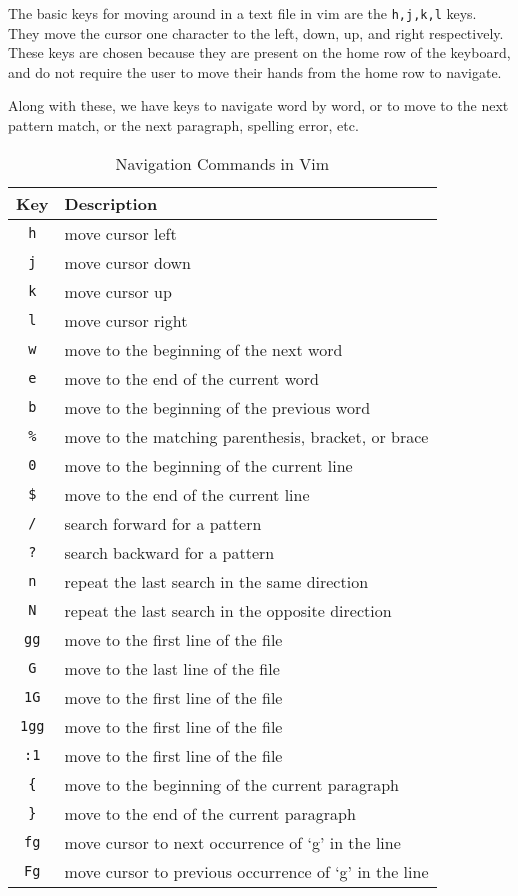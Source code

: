 The basic keys for moving around in a text file in vim
are the \texttt{h,j,k,l} keys. They move the cursor
one character to the left, down, up, and right respectively.
These keys are chosen because they are present on the
home row of the keyboard, and do not require the user
to move their hands from the home row to navigate.

Along with these, we have keys to navigate word by word,
or to move to the next pattern match, or the next
paragraph, spelling error, etc.

\begin{table}[h!]
  \caption{Navigation Commands in Vim}
  \begin{tabular}{c l}
    \toprule
    Key & Description \\
    \midrule
    \texttt{h} & move cursor left \\
    \texttt{j} & move cursor down \\
    \texttt{k} & move cursor up \\
    \texttt{l} & move cursor right \\
    \texttt{w} & move to the beginning of the next word \\
    \texttt{e} & move to the end of the current word \\
    \texttt{b} & move to the beginning of the previous word \\
    \texttt{\%} & move to the matching parenthesis, bracket, or brace \\
    \texttt{0} & move to the beginning of the current line \\
    \texttt{\$} & move to the end of the current line \\
    \texttt{/} & search forward for a pattern \\
    \texttt{?} & search backward for a pattern \\
    \texttt{n} & repeat the last search in the same direction \\
    \texttt{N} & repeat the last search in the opposite direction \\
    \texttt{gg} & move to the first line of the file \\
    \texttt{G} & move to the last line of the file \\
    \texttt{1G} & move to the first line of the file \\
    \texttt{1gg} & move to the first line of the file \\
    \texttt{:1} & move to the first line of the file \\
    \texttt{\{} & move to the beginning of the current paragraph \\
    \texttt{\}} & move to the end of the current paragraph \\
    \texttt{fg} & move cursor to next occurrence of `g' in the line \\
    \texttt{Fg} & move cursor to previous occurrence of `g' in the line \\
    \bottomrule
  \end{tabular}
\end{table}

